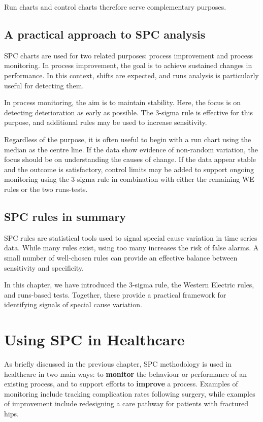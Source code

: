 \documentclass[
]{book}
\begin{document}
Run charts and control charts therefore serve complementary purposes.

\section{A practical approach to SPC analysis}\label{a-practical-approach-to-spc-analysis}

SPC charts are used for two related purposes: process improvement and process monitoring.
In process improvement, the goal is to achieve sustained changes in performance. In this context, shifts are expected, and runs analysis is particularly useful for detecting them.

In process monitoring, the aim is to maintain stability. Here, the focus is on detecting deterioration as early as possible. The 3-sigma rule is effective for this purpose, and additional rules may be used to increase sensitivity.

Regardless of the purpose, it is often useful to begin with a run chart using the median as the centre line. If the data show evidence of non-random variation, the focus should be on understanding the causes of change. If the data appear stable and the outcome is satisfactory, control limits may be added to support ongoing monitoring using the 3-sigma rule in combination with either the remaining WE rules or the two runs-tests.

\section{SPC rules in summary}\label{spc-rules-in-summary}

SPC rules are statistical tools used to signal special cause variation in time series data. While many rules exist, using too many increases the risk of false alarms. A small number of well-chosen rules can provide an effective balance between sensitivity and specificity.

In this chapter, we have introduced the 3-sigma rule, the Western Electric rules, and runs-based tests. Together, these provide a practical framework for identifying signals of special cause variation.

\chapter{Using SPC in Healthcare}\label{using}

As briefly discussed in the previous chapter, SPC methodology is used in healthcare in two main ways: to \textbf{monitor} the behaviour or performance of an existing process, and to support efforts to \textbf{improve} a process. Examples of monitoring include tracking complication rates following surgery, while examples of improvement include redesigning a care pathway for patients with fractured hips.
\end{document}
